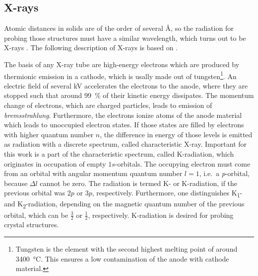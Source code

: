 \subsection{X-rays}\label{Sec:Theory_XRays}
Atomic distances in solids are of the order of several \si{\angstrom}, so the radiation for probing those structures must have a similar wavelength, which turns out to be X-rays
    \cite{harrington2021}.
The following description of X-rays is based on \textcite{spiess2009}.

The basis of any X-ray tube are high-energy electrons which are produced by thermionic emission in a cathode, which is usally made out of tungsten\footnote{
    Tungsten is the element with the second highest melting point of around \qty{3400}{\celsius}.
    This ensures a low contamination of the anode with cathode material.
}.
An electric field of several \si{\kV} accelerates the electrons to the anode, where they are stopped such that around \qty{99}{\percent} of their kinetic energy dissipates.
The momentum change of electrons, which are charged particles, leads to emission of \textit{bremsstrahlung}.
Furthermore, the electrons ionize atoms of the anode material which leads to unoccupied electron states.
If those states are filled by electrons with higher quantum number $n$, the difference in energy of those levels is emitted as radiation with a discrete spectrum, called characteristic X-ray.
Important for this work is a part of the characteristic spectrum, called K-radiation, which originates in occupation of empty $1s$-orbitals.
The occupying electron must come from an orbital with angular momentum quantum number $l=1$, i.e.\ a \textit{p}-orbital, because $\Delta l$ cannot be zero.
The radiation is termed K\textalpha- or K\textbeta-radiation, if the previous orbital was $2p$ or $3p$, respectively.
Furthermore, one distinguishes K\textalpha\textsubscript{1}- and K\textalpha\textsubscript{2}-radiation, depending on the magnetic quantum number of the previous orbital, which can be $\frac{3}{2}$ or $\frac{1}{2}$, respectively.
K\textalpha-radiation is desired for probing crystal structures.